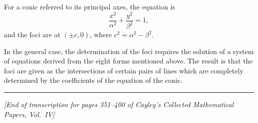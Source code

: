 \documentclass[11pt,a4paper]{article}
\theoremstyle{definition}
\begin{document}
For a conic referred to its principal axes, the equation is
\[\frac{x^{2}}{\alpha^{2}} + \frac{y^{2}}{\beta^{2}} = 1,\]
and the foci are at $(\pm c, 0)$, where $c^{2} = \alpha^{2} - \beta^{2}$.

In the general case, the determination of the foci requires the solution of a system of
equations derived from the eight forms mentioned above. The result is that the foci are
given as the intersections of certain pairs of lines which are completely determined by
the coefficients of the equation of the conic.

\vspace{2em}
\noindent\rule{\textwidth}{0.4pt}
\vspace{0.5em}

\noindent\textit{[End of transcription for pages 351--400 of Cayley's Collected Mathematical Papers, Vol.~IV]}
\end{document}
